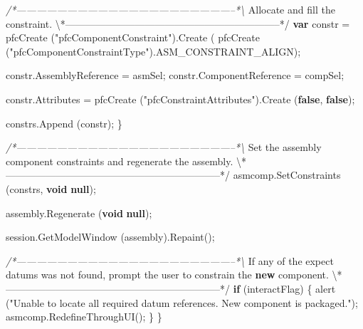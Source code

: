 \documentclass[]{article}
\newenvironment{Shaded}{}{}
\newcommand{\KeywordTok}[1]{\textcolor[rgb]{0.00,0.44,0.13}{\textbf{{#1}}}}
\newcommand{\StringTok}[1]{\textcolor[rgb]{0.25,0.44,0.63}{{#1}}}
\newcommand{\CommentTok}[1]{\textcolor[rgb]{0.38,0.63,0.69}{\textit{{#1}}}}
\newcommand{\OtherTok}[1]{\textcolor[rgb]{0.00,0.44,0.13}{{#1}}}
\newcommand{\FunctionTok}[1]{\textcolor[rgb]{0.02,0.16,0.49}{{#1}}}
\newcommand{\NormalTok}[1]{{#1}}
\begin{document}
\begin{Shaded}
\begin{Highlighting}[]
\CommentTok{/*-----------------------------------------------------------------*\textbackslash{}}
  \NormalTok{Allocate and fill the }\OtherTok{constraint}\NormalTok{.}
\NormalTok{\textbackslash{}*-----------------------------------------------------------------*}\OtherTok{/}
      \KeywordTok{var} \NormalTok{constr = }\FunctionTok{pfcCreate} \NormalTok{(}\StringTok{"pfcComponentConstraint"}\NormalTok{).}\FunctionTok{Create} \NormalTok{(}
                                \FunctionTok{pfcCreate} \NormalTok{(}\StringTok{"pfcComponentConstraintType"}\NormalTok{).}\FunctionTok{ASM_CONSTRAINT_ALIGN}\NormalTok{);}
      
      \OtherTok{constr}\NormalTok{.}\FunctionTok{AssemblyReference}  \NormalTok{= asmSel;}
      \OtherTok{constr}\NormalTok{.}\FunctionTok{ComponentReference} \NormalTok{= compSel;}
      
      \OtherTok{constr}\NormalTok{.}\FunctionTok{Attributes} \NormalTok{= }\FunctionTok{pfcCreate} \NormalTok{(}\StringTok{"pfcConstraintAttributes"}\NormalTok{).}\FunctionTok{Create} \NormalTok{(}\KeywordTok{false}\NormalTok{, }\KeywordTok{false}\NormalTok{);}
      
      \OtherTok{constrs}\NormalTok{.}\FunctionTok{Append} \NormalTok{(constr);}
    \NormalTok{\}}

\CommentTok{/*-----------------------------------------------------------------*\textbackslash{}}
  \NormalTok{Set the assembly component constraints and regenerate the }\OtherTok{assembly}\NormalTok{.}
\NormalTok{\textbackslash{}*-----------------------------------------------------------------*}\OtherTok{/}
  \OtherTok{asmcomp}\NormalTok{.}\FunctionTok{SetConstraints} \NormalTok{(constrs, }\KeywordTok{void} \KeywordTok{null}\NormalTok{);}
  
  \OtherTok{assembly}\NormalTok{.}\FunctionTok{Regenerate} \NormalTok{(}\KeywordTok{void} \KeywordTok{null}\NormalTok{);}
  
  \OtherTok{session}\NormalTok{.}\FunctionTok{GetModelWindow} \NormalTok{(assembly).}\FunctionTok{Repaint}\NormalTok{();}

\CommentTok{/*-----------------------------------------------------------------*\textbackslash{}}
  \NormalTok{If any of the expect datums was not found, prompt the user to constrain}
  \NormalTok{the }\KeywordTok{new} \OtherTok{component}\NormalTok{.}
\NormalTok{\textbackslash{}*-----------------------------------------------------------------*}\OtherTok{/}
  \KeywordTok{if} \NormalTok{(interactFlag)}
    \NormalTok{\{}
      \FunctionTok{alert} \NormalTok{(}\StringTok{"Unable to locate all required datum references.  New component is packaged."}\NormalTok{);}
      \OtherTok{asmcomp}\NormalTok{.}\FunctionTok{RedefineThroughUI}\NormalTok{();}
    \NormalTok{\}}
\NormalTok{\}}

\end{Highlighting}
\end{Shaded}
\end{document}
